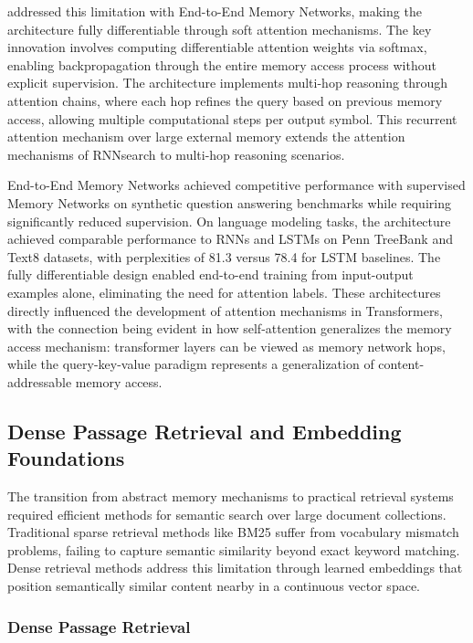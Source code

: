 \citet{sukhbaatar2015end} addressed this limitation with End-to-End Memory Networks, making the architecture fully differentiable through soft attention mechanisms. The key innovation involves computing differentiable attention weights via softmax, enabling backpropagation through the entire memory access process without explicit supervision. The architecture implements multi-hop reasoning through attention chains, where each hop refines the query based on previous memory access, allowing multiple computational steps per output symbol. This recurrent attention mechanism over large external memory extends the attention mechanisms of RNNsearch to multi-hop reasoning scenarios.

End-to-End Memory Networks achieved competitive performance with supervised Memory Networks on synthetic question answering benchmarks while requiring significantly reduced supervision. On language modeling tasks, the architecture achieved comparable performance to RNNs and LSTMs on Penn TreeBank and Text8 datasets, with perplexities of 81.3 versus 78.4 for LSTM baselines. The fully differentiable design enabled end-to-end training from input-output examples alone, eliminating the need for attention labels. These architectures directly influenced the development of attention mechanisms in Transformers, with the connection being evident in how self-attention generalizes the memory access mechanism: transformer layers can be viewed as memory network hops, while the query-key-value paradigm represents a generalization of content-addressable memory access.

\subsection{Dense Passage Retrieval and Embedding Foundations}

The transition from abstract memory mechanisms to practical retrieval systems required efficient methods for semantic search over large document collections. Traditional sparse retrieval methods like BM25 suffer from vocabulary mismatch problems, failing to capture semantic similarity beyond exact keyword matching. Dense retrieval methods address this limitation through learned embeddings that position semantically similar content nearby in a continuous vector space.

\subsubsection{Dense Passage Retrieval}

